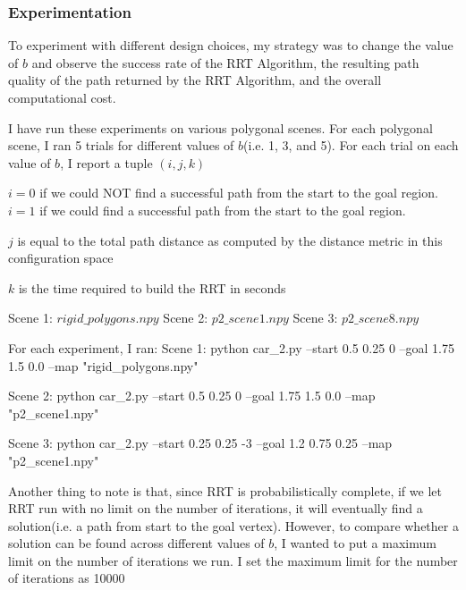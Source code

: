 \documentclass{article}
\begin{document}
\subsubsection{Experimentation}
To experiment with different design choices, my strategy was to change the value of $b$ and observe the success rate of the RRT Algorithm, the resulting path quality of the path returned by the RRT Algorithm, and the overall computational cost. 

I have run these experiments on various polygonal scenes. For each polygonal scene, I ran 5 trials for different values of $b$(i.e. 1, 3, and 5). For each trial on each value of $b$, I report a tuple $(i, j, k)$ \newline 

$i = 0$ if we could NOT find a successful path from the start to the goal region. $i = 1$ if we could find a successful path from the start to the goal region. \newline 

$j$ is equal to the total path distance as computed by the distance metric in this configuration space \newline 

$k$ is the time required to build the RRT in seconds \newline 

Scene 1: $rigid\_polygons.npy$ \newline 
Scene 2: $p2\_scene1.npy$ \newline 
Scene 3: $p2\_scene8.npy$ \newline 

For each experiment, I ran: \newline 
Scene 1: python car\_2.py --start 0.5 0.25 0 --goal 1.75 1.5 0.0 --map "rigid\_polygons.npy" \newline 

Scene 2: python car\_2.py --start 0.5 0.25 0 --goal 1.75 1.5 0.0 --map "p2\_scene1.npy" \newline

Scene 3: python car\_2.py --start 0.25 0.25 -3 --goal 1.2 0.75 0.25 --map "p2\_scene1.npy" \newline


Another thing to note is that, since RRT is probabilistically complete, if we let RRT run with no limit on the number of iterations, it will eventually find a solution(i.e. a path from start to the goal vertex). However, to compare whether a solution can be found across different values of $b$, I wanted to put a maximum limit on the number of iterations we run. I set the maximum limit for the number of iterations as 10000 
 
\end{document}
